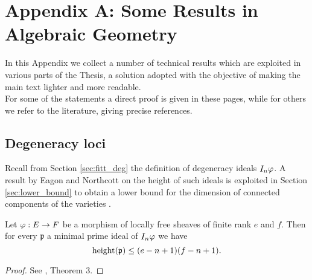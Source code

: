 
\chapter{Appendix A: Some Results in Algebraic Geometry}\label{serre_duality} %



\ifpdf
    \graphicspath{{figures/}{figures/}{figures/}}
\else
    \graphicspath{{figures/}{figures/}}
\fi


In this Appendix we collect a number of technical results which are exploited in various parts of the Thesis, a solution adopted with the objective of making the main text lighter and more readable.\\ 
For some of the statements a direct proof is given in these pages, while for others we refer to the literature, giving precise references.

\section{Degeneracy loci}
	
	Recall from Section \ref{sec:fitt_deg} the definition of degeneracy ideals $I_n \varphi$. A result by Eagon and Northcott on the height of such ideals is exploited in Section \ref{sec:lower_bound} to obtain a lower bound for the dimension of connected components of the varieties \modu.
	\begin{theo}\label{thm:height}
		Let $\varphi:E\to F$ be a morphism of locally free sheaves of finite rank $e$ and $f$. Then for every $\mathfrak{p}$ a minimal prime ideal of $I_n \varphi$ we have
		$$ \operatorname{height} (\mathfrak{p}) \leq (e-n+1)(f-n+1). $$
	\end{theo}
	\begin{proof}
		See \cite{NORTH}, Theorem 3.
	\end{proof}

